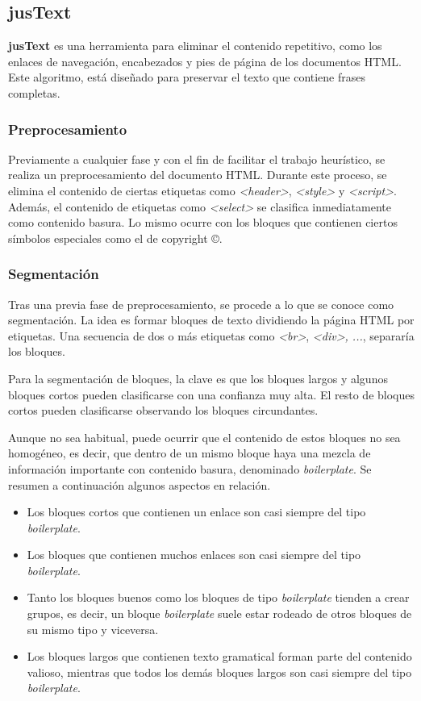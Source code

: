 \subsection{jusText}
\label{subsec:justext}

\textbf{jusText} \cite{justext} es una herramienta para eliminar el contenido repetitivo, como los enlaces
de navegación, encabezados y pies de página de los documentos HTML. Este algoritmo, está diseñado para
preservar el texto que contiene frases completas.

\subsubsection{Preprocesamiento}
\label{subsubsec:preprocesamiento}

Previamente a cualquier fase y con el fin de facilitar el trabajo heurístico, se realiza un preprocesamiento 
del documento HTML. Durante este proceso, se elimina el contenido de ciertas etiquetas como \emph{<header>}, 
\emph{<style>} y \emph{<script>}. Además, el contenido de etiquetas como \emph{<select>} se clasifica 
inmediatamente como contenido basura. Lo mismo ocurre con los bloques que contienen ciertos símbolos 
especiales como el de copyright ©.

\subsubsection{Segmentación}
\label{subsubsec:segmentacion}

Tras una previa fase de preprocesamiento, se procede a lo que se conoce como segmentación. La idea es formar 
bloques de texto dividiendo la página HTML por etiquetas. Una secuencia de dos o más etiquetas como 
\emph{<br>}, \emph{<div>, ...}, separaría los bloques. 

Para la segmentación de bloques, la clave es que los bloques largos y algunos bloques cortos pueden
clasificarse con una confianza muy alta. El resto de bloques cortos pueden clasificarse observando los
bloques circundantes. 

Aunque no sea habitual, puede ocurrir que el contenido de estos bloques no sea homogéneo, es decir, que
dentro de un mismo bloque haya una mezcla de información importante con contenido basura, denominado
\emph{boilerplate}. Se resumen a continuación algunos aspectos en relación.

\begin{itemize}
  \item Los bloques cortos que contienen un enlace son casi siempre del tipo \emph{boilerplate}.
  \item Los bloques que contienen muchos enlaces son casi siempre del tipo \emph{boilerplate}.
  \item Tanto los bloques buenos como los bloques de tipo \emph{boilerplate} tienden a crear grupos, es 
  decir, un bloque \emph{boilerplate} suele estar rodeado de otros bloques de su mismo tipo y viceversa.
  \item Los bloques largos que contienen texto gramatical forman parte del contenido valioso, mientras que 
  todos los demás bloques largos son casi siempre del tipo \emph{boilerplate}.
\end{itemize}

